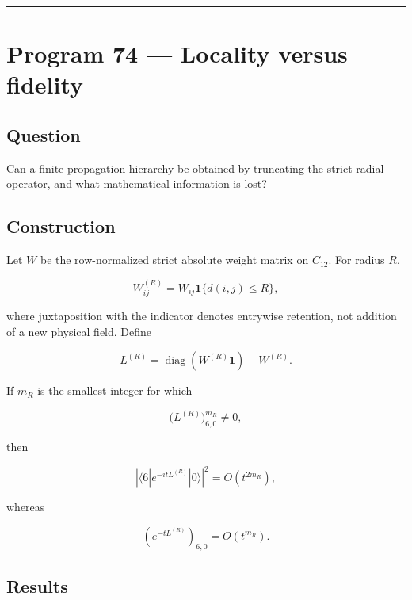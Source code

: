 \documentclass[11pt,a4paper,openany]{report}
\begin{document}
\par\medskip\hrule\medskip

\chapter{Program 74 --- Locality versus fidelity}

\section{Question}

Can a finite propagation hierarchy be obtained by truncating the strict radial operator, and what mathematical information is lost?

\section{Construction}

Let \(W\) be the row-normalized strict absolute weight matrix on \(C_{12}\). For radius \(R\),

\[
W^{(R)}_{ij}
=
W_{ij}
\mathbf1\{d(i,j)\le R\},
\]

where juxtaposition with the indicator denotes entrywise retention, not addition of a new physical field. Define

\[
L^{(R)}
=
\operatorname{diag}(W^{(R)}\mathbf1)-W^{(R)}.
\]

If \(m_R\) is the smallest integer for which

\[
\bigl(L^{(R)}\bigr)^{m_R}_{6,0}\ne0,
\]

then

\[
\left|
\langle6|e^{-itL^{(R)}}|0\rangle
\right|^2
=
O(t^{2m_R}),
\]

whereas

\[
\left(e^{-tL^{(R)}}\right)_{6,0}
=
O(t^{m_R}).
\]

\section{Results}
\end{document}
